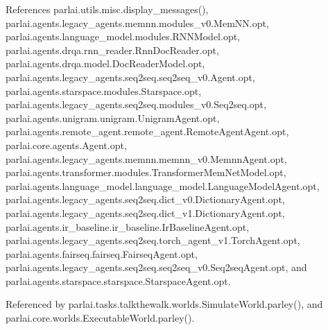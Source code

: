 References parlai.\+utils.\+misc.\+display\+\_\+messages(), parlai.\+agents.\+legacy\+\_\+agents.\+memnn.\+modules\+\_\+v0.\+Mem\+N\+N.\+opt, parlai.\+agents.\+language\+\_\+model.\+modules.\+R\+N\+N\+Model.\+opt, parlai.\+agents.\+drqa.\+rnn\+\_\+reader.\+Rnn\+Doc\+Reader.\+opt, parlai.\+agents.\+drqa.\+model.\+Doc\+Reader\+Model.\+opt, parlai.\+agents.\+legacy\+\_\+agents.\+seq2seq.\+seq2seq\+\_\+v0.\+Agent.\+opt, parlai.\+agents.\+starspace.\+modules.\+Starspace.\+opt, parlai.\+agents.\+legacy\+\_\+agents.\+seq2seq.\+modules\+\_\+v0.\+Seq2seq.\+opt, parlai.\+agents.\+unigram.\+unigram.\+Unigram\+Agent.\+opt, parlai.\+agents.\+remote\+\_\+agent.\+remote\+\_\+agent.\+Remote\+Agent\+Agent.\+opt, parlai.\+core.\+agents.\+Agent.\+opt, parlai.\+agents.\+legacy\+\_\+agents.\+memnn.\+memnn\+\_\+v0.\+Memnn\+Agent.\+opt, parlai.\+agents.\+transformer.\+modules.\+Transformer\+Mem\+Net\+Model.\+opt, parlai.\+agents.\+language\+\_\+model.\+language\+\_\+model.\+Language\+Model\+Agent.\+opt, parlai.\+agents.\+legacy\+\_\+agents.\+seq2seq.\+dict\+\_\+v0.\+Dictionary\+Agent.\+opt, parlai.\+agents.\+legacy\+\_\+agents.\+seq2seq.\+dict\+\_\+v1.\+Dictionary\+Agent.\+opt, parlai.\+agents.\+ir\+\_\+baseline.\+ir\+\_\+baseline.\+Ir\+Baseline\+Agent.\+opt, parlai.\+agents.\+legacy\+\_\+agents.\+seq2seq.\+torch\+\_\+agent\+\_\+v1.\+Torch\+Agent.\+opt, parlai.\+agents.\+fairseq.\+fairseq.\+Fairseq\+Agent.\+opt, parlai.\+agents.\+legacy\+\_\+agents.\+seq2seq.\+seq2seq\+\_\+v0.\+Seq2seq\+Agent.\+opt, and parlai.\+agents.\+starspace.\+starspace.\+Starspace\+Agent.\+opt.



Referenced by parlai.\+tasks.\+talkthewalk.\+worlds.\+Simulate\+World.\+parley(), and parlai.\+core.\+worlds.\+Executable\+World.\+parley().

